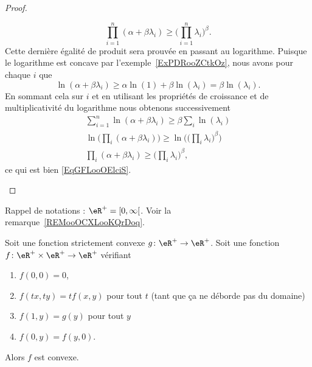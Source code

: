 \begin{proof}
\begin{subproof}
\begin{equation}
			\prod_{i=1}^n(\alpha+\beta\lambda_i)\geq \big( \prod_{i=1}^n\lambda_i \big)^{\beta}.
		\end{equation}
		Cette dernière égalité de produit sera prouvée en passant au logarithme.
		\spitem[Logarithme]
		Puisque le logarithme est concave par l'exemple~\ref{ExPDRooZCtkOz}, nous avons pour chaque \( i\) que
		\begin{equation}
			\ln(\alpha+\beta\lambda_i)\geq \alpha\ln(1)+\beta\ln(\lambda_i)=\beta\ln(\lambda_i).
		\end{equation}
		En sommant cela sur \( i\) et en utilisant les propriétés de croissance et de multiplicativité du logarithme nous obtenons successivement
		\begin{subequations}
			\begin{align}
				\sum_{i=1}^n\ln(\alpha+\beta\lambda_i)\geq \beta\sum_i\ln(\lambda_i)                                 \\
				\ln\big( \prod_i(\alpha+\beta\lambda_i) \big)\geq\ln\Big( \big( \prod_i\lambda_i \big)^{\beta} \Big) \\
				\prod_i(\alpha+\beta\lambda_i)\geq\big( \prod_i\lambda_i \big)^{\beta},
			\end{align}
		\end{subequations}
		ce qui est bien \eqref{EqGFLooOElciS}.
	\end{subproof}
\end{proof}

Rappel de notations : \( \eR^+=\mathopen[ 0 , \infty \mathclose[\). Voir la remarque~\ref{REMooOCXLooKQrDoq}.
\begin{lemma}        \label{LEMooNUDOooVfVPkw}
	Soit une fonction strictement convexe \( g\colon \eR^+\to \eR^+\). Soit une fonction \( f\colon \eR^+\times \eR^+\to \eR^+\) vérifiant
	\begin{enumerate}
		\item
		      \( f(0,0)=0\),
		\item
		      \( f(tx,ty)=tf(x,y)\) pour tout \( t\) (tant que ça ne déborde pas du domaine)
		\item
		      \( f(1,y)=g(y)\) pour tout \( y\)
		\item
		      \( f(0,y)=f(y,0)\).
	\end{enumerate}
	Alors \( f\) est convexe.
\end{lemma}

